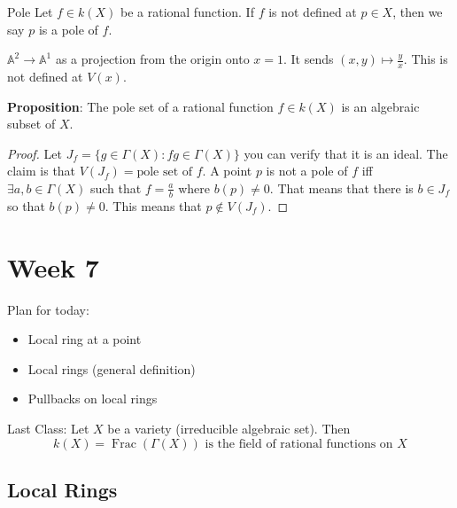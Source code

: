 \documentclass{report}
\begin{document}
\begin{definition}{Pole}
    Let $f \in k(X)$ be a rational function. If $f$ is not defined at $p \in X$, then we say $p$ is a pole of $f$.
\end{definition}

\begin{examples}
    \begin{example}
        $\mathbb{A}^{2} \rightarrow \mathbb{A}^{1}$ as a projection from the origin onto $x = 1$. It sends $(x, y) \mapsto \frac{y}{x}$. This is not defined at $V(x)$.
    \end{example}
\end{examples}

\textbf{Proposition}: The pole set of a rational function $f \in k(X)$ is an algebraic subset of $X$.
    \begin{proof}
        Let $J_{f} = \{g \in \Gamma(X) : fg \in \Gamma(X)\}$ you can verify that it is an ideal. The claim is that $V(J_{f}) = \text{pole set of } f$. A point $p$ is not a pole of $f$ iff $\exists a, b \in \Gamma(X)$ such that $f = \frac{a}{b}$ where $b(p) \neq 0$. That means that there is $b \in J_{f}$ so that $b(p) \neq 0$. This means that $p \not\in V(J_{f})$.
    \end{proof} 

\chapter{Week 7}

Plan for today:
    \begin{itemize}
        \item Local ring at a point

        \item Local rings (general definition)

        \item Pullbacks on local rings 
    \end{itemize}

Last Class: Let $X$ be a variety (irreducible algebraic set). Then
    \begin{equation*}
        k(X) = \mathop{Frac}(\Gamma(X)) \text{ is the field of rational functions on $X$}
    \end{equation*}

\begin{topic}
    \section{Local Rings}
\end{topic}
\end{document}
